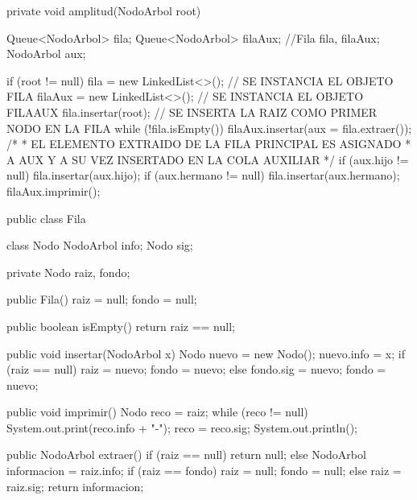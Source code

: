 private void amplitud(NodoArbol root) {
            Queue<NodoArbol> fila; 
            Queue<NodoArbol> filaAux;
            //Fila fila, filaAux; 
            NodoArbol aux; 

            if (root != null) {
                  fila = new LinkedList<>(); // SE INSTANCIA EL OBJETO FILA
                  filaAux = new LinkedList<>(); // SE INSTANCIA EL OBJETO FILAAUX
                  fila.insertar(root); // SE INSERTA LA RAIZ COMO PRIMER NODO EN LA FILA
                  while (!fila.isEmpty()) {
                        filaAux.insertar(aux = fila.extraer()); /*
                                                                 * EL ELEMENTO EXTRAIDO DE LA FILA PRINCIPAL ES ASIGNADO
                                                                 * A AUX Y A SU VEZ INSERTADO EN LA COLA AUXILIAR
                                                                 */
                        if (aux.hijo != null) {
                              fila.insertar(aux.hijo);
                        }
                        if (aux.hermano != null) {
                              fila.insertar(aux.hermano);
                        }
                  }
                  filaAux.imprimir();
            }
      }

      public class Fila {
            class Nodo {
                  NodoArbol info;
                  Nodo sig;
            }

            private Nodo raiz, fondo;

            public Fila() {
                  raiz = null;
                  fondo = null;
            }

            public boolean isEmpty() {
                  return raiz == null;
            }

            public void insertar(NodoArbol x) {
                  Nodo nuevo = new Nodo();
                  nuevo.info = x;
                  if (raiz == null) {
                        raiz = nuevo;
                        fondo = nuevo;
                  } else {
                        fondo.sig = nuevo;
                        fondo = nuevo;
                  }
            }

            public void imprimir() {
                  Nodo reco = raiz;
                  while (reco != null) {
                        System.out.print(reco.info + "-");
                        reco = reco.sig;
                  }
                  System.out.println();
            }

            public NodoArbol extraer() {
                  if (raiz == null) {
                        return null;
                  } else {
                        NodoArbol informacion = raiz.info;
                        if (raiz == fondo) {
                              raiz = null;
                              fondo = null;
                        } else {
                              raiz = raiz.sig;
                        }
                        return informacion;
                  }
            }
      }